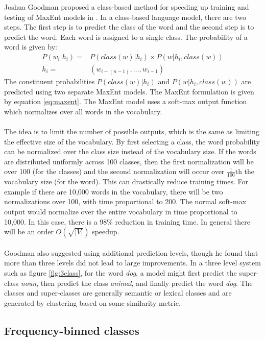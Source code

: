 Joshua Goodman proposed a class-based method for speeding up training and testing of MaxEnt models in \cite{Goodman2001}. In a class-based language model, there are two steps. The first step is to predict the class of the word and the second step is to predict the word. Each word is assigned to a single class. 
The probability of a word is given by:
\begin{align}
P(w_i | h_i)  =&  P(class(w) | h_i) \times P(w|  h_i, class(w))
\\ h_i =& ( w_{i-(n-1)},\dots, w_{i-1} ) \nonumber
\end{align}
The constituent probabilities $P(class(w) | h_i)$ and $P(w|  h_i, class(w))$ are predicted using two separate MaxEnt models. The MaxEnt formulation is given by equation \ref{eq:maxent}. The MaxEnt model uses a soft-max output function which normalizes over all words in the vocabulary.
\paragraph{}
The idea is to limit the number of possible outputs, which is the same as limiting the effective size of the vocabulary. By first selecting a class, the word probability can be normalized over the class size instead of the vocabulary size. If the words are distributed uniformly across 100 classes, then the first normalization will be over 100 (for the classes) and the second normalization will occur over $\frac{1}{100}$th the vocabulary size (for the word). This can drastically reduce training times. For example if there are 10,000 words in the vocabulary, there will be two normalizations over 100, with time proportional to 200. The normal soft-max output would normalize over the entire vocabulary in time proportional to 10,000. In this case, there is a 98\% reduction in training time. In general there will be an order $O(\sqrt{|V|})$ speedup.
\paragraph{}
Goodman also suggested using additional prediction levels, though he found that more than three levels did not lead to large improvements. In a three level system such as figure \ref{fig:3class}, for the word \emph{dog}, a model might first predict the super-class \emph{noun}, then predict the class \emph{animal}, and finally predict the word \emph{dog}. The classes and super-classes are generally semantic or lexical classes and are generated by clustering based on some similarity metric.
\subsection{Frequency-binned classes} \label{sec:frequencybinning}
